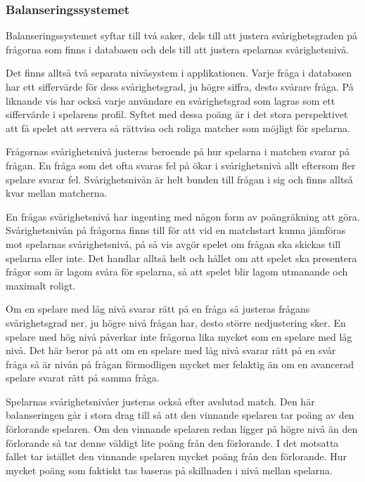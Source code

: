 \documentclass[a4paper, 11pt]{article}
\begin{document}
\subsubsection{Balanseringssystemet} \label{balanseringssystemet}
Balanseringssystemet syftar till två saker, dels till att justera svårighetsgraden på frågorna som finns i databasen och dels till att justera spelarnas svårighetsnivå. 

Det finns alltså två separata nivåsystem i applikationen. Varje fråga i databasen har ett siffervärde för dess svårighetsgrad, ju högre siffra, desto svårare fråga. På liknande vis har också varje användare en svårighetsgrad som lagras som ett siffervärde i spelarens profil. Syftet med dessa poäng är i det stora perspektivet att få spelet att servera så rättvisa och roliga matcher som möjligt för spelarna. 

Frågornas svårighetsnivå justeras beroende på hur spelarna i matchen svarar på frågan. En fråga som det ofta svaras fel på ökar i svårighetsnivå allt eftersom fler spelare svarar fel. Svårighetsnivån är helt bunden till frågan i sig och finns alltså kvar mellan matcherna.

En frågas svårighetsnivå har ingenting med någon form av poängräkning att göra. Svårighetsnivån på frågorna finns till för att vid en matchstart kunna jämföras mot spelarnas svårighetsnivå, på så vis avgör spelet om frågan ska skickas till spelarna eller inte. Det handlar alltså helt och hållet om att spelet ska presentera frågor som är lagom svåra för spelarna, så att spelet blir lagom utmanande och maximalt roligt.

Om en spelare med låg nivå svarar rätt på en fråga så justeras frågans svårighetsgrad ner, ju högre nivå frågan har, desto större nedjustering sker. En spelare med hög nivå påverkar inte frågorna lika mycket som en spelare med låg nivå. Det här beror på att om en spelare med låg nivå svarar rätt på en svår fråga så är nivån på frågan förmodligen mycket mer felaktig än om en avancerad spelare svarat rätt på samma fråga. 

Spelarnas svårighetsnivåer justeras också efter avslutad match. Den här balanseringen går i stora drag till så att den vinnande spelaren tar poäng av den förlorande spelaren. Om den vinnande spelaren redan ligger på högre nivå än den förlorande så tar denne väldigt lite poäng från den förlorande. I det motsatta fallet tar istället den vinnande spelaren mycket poäng från den förlorande. Hur mycket poäng som faktiskt tas baseras på skillnaden i nivå mellan spelarna. 
\end{document}
